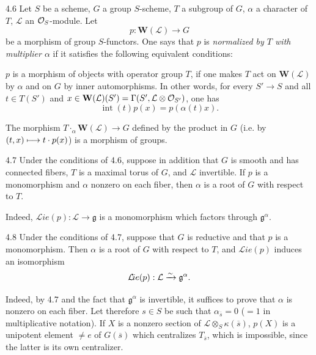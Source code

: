 \begin{definition}{4.6}\label{XIX.4.6}
Let $S$ be a scheme, $G$ a group $S$-scheme, $T$ a subgroup of $G$, $\alpha$ a character of $T$, $\mathcal L$ an $\mathcal{O}_S$-module. Let
\[
p:\mathbf W(\mathcal L)\to G
\]
{\renewcommand{\thefootnote}{(35)}}%
be a morphism of group $S$-functors. One says that $p$ is \emph{normalized by $T$ with multiplier $\alpha$} if it satisfies the following equivalent conditions:
\begin{enumeratei}
\item $p$ is a morphism of objects with operator group $T$, if one makes $T$ act on $\mathbf W(\mathcal L)$ by $\alpha$ and on $G$ by inner automorphisms. In other words, for every $S'\to S$ and all $t\in T(S')$ and $x\in\mathbf W(\mathcal L)(S')=\Gamma(S',\mathcal L\otimes\mathcal{O}_{S'})$, one has
\[
\operatorname{int}(t)p(x)=p(\alpha(t)x).
\]
\item The morphism $T\cdot_\alpha\mathbf W(\mathcal L)\to G$ defined by the product in $G$ (i.e. by $(t,x)\longmapsto t\cdot p(x)$) is a morphism of groups.
\end{enumeratei}
\end{definition}

\begin{lemma}{4.7}\label{XIX.4.7}
Under the conditions of 4.6, suppose in addition that $G$ is smooth and has connected fibers,{\renewcommand{\thefootnote}{(36)}} $T$ is a maximal torus of $G$, and $\mathcal L$ invertible. If $p$ is a monomorphism and $\alpha$ nonzero on each fiber, then $\alpha$ is a root of $G$ with respect to $T$.
\end{lemma}
Indeed, $\mathcal{L}\!ie(p):\mathcal L\to\mathfrak g$ is a monomorphism which factors through $\mathfrak g^\alpha$.

\begin{proposition}{4.8}\label{XIX.4.8}
Under the conditions of 4.7, suppose that $G$ is reductive and that $p$ is a monomorphism. Then $\alpha$ is a root of $G$ with respect to $T$, and $\mathcal{L}\!ie(p)$ induces an isomorphism
\[
\mathcal{L}\!ie(p):\mathcal L\xrightarrow{\sim}\mathfrak g^\alpha.
\]
\end{proposition}
Indeed, by 4.7 and the fact that $\mathfrak g^\alpha$ is invertible, it suffices to prove that $\alpha$ is nonzero on each fiber. Let therefore $s\in S$ be such that $\alpha_{\overline{s}}=0$ ($=1$ in multiplicative notation). If $X$ is a nonzero section of $\mathcal L\otimes_S\kappa(\overline{s})$, $p(X)$ is a unipotent element $\ne e$ of $G(\overline{s})$ which centralizes $T_{\overline{s}}$, which is impossible, since the latter is its own centralizer.

